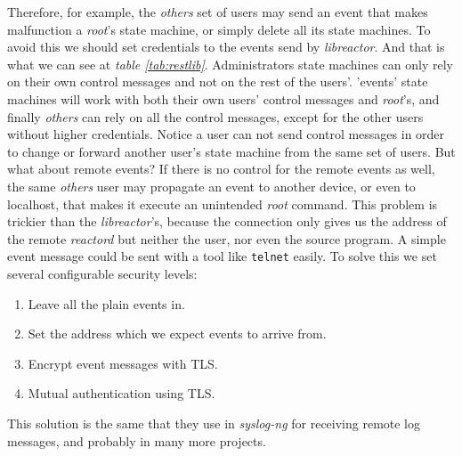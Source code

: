 Therefore, for example, the \emph{others} set of users may send an event that makes malfunction a \emph{root}'s state machine, or simply 
delete all its state machines. To avoid this we should set credentials to the events send by \emph{libreactor}. And that is what we can see
at \emph{table \ref{tab:restlib}}. Administrators state machines can only rely on their own control messages and not on the rest of the 
users'. 'events' state machines will work with both their own users' control messages and \emph{root}'s, and finally \emph{others} can rely
on all the control messages, except for the other users without higher credentials. Notice a user can not send control messages in order 
to change or forward another user's state machine from the same set of users. But what about remote events? If there is no control for the 
remote events as well, the same \emph{others} user may propagate an event to another device, or even to localhost, 
that makes it execute an unintended \emph{root} command. This problem is trickier than the \emph{libreactor}'s, because the connection
only gives us the address of the remote \emph{reactord} but neither the user, nor even the source program. A simple event message could be
sent with a tool like \texttt{telnet} easily. To solve this we set several configurable security levels:
\begin{enumerate}
 \item Leave all the plain events in.
 \item Set the address which we expect events to arrive from.
 \item Encrypt event messages with TLS.
 \item Mutual authentication using TLS.
\end{enumerate}
This solution is the same that they use in \emph{syslog-ng}\cite{man:syslog-ng} for receiving remote log messages, and probably in many 
more projects.
